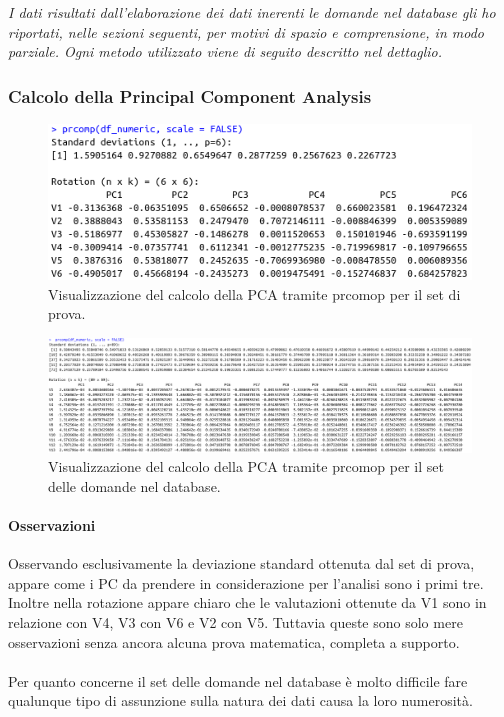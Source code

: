 \textit{I dati risultati dall'elaborazione dei dati inerenti le domande nel database gli ho riportati, nelle sezioni seguenti, per motivi di spazio e comprensione, in modo parziale. Ogni metodo utilizzato viene di seguito descritto nel dettaglio.}

\subsubsection{Calcolo della Principal Component Analysis}
\label{Calcolo della Principal Component Analysis}
\begin{figure}[H]
\centering
	\includegraphics[width=0.80\linewidth]{../../PCA/plot/prcomp_rete-prova.png}
	\caption{Visualizzazione del calcolo della PCA tramite prcomop per il set di prova.}
	\label{Visualizzazione del calcolo della PCA tramite prcomop per il set di prova.}
\end{figure}

\begin{figure}[H]
\centering
	\includegraphics[width=1\linewidth]{../../PCA/plot/prcomp_rete-db.png}
	\caption{Visualizzazione del calcolo della PCA tramite prcomop per il set delle domande nel database.}
	\label{Visualizzazione del calcolo della PCA tramite prcomop per il set delle domande nel database.}
\end{figure}
\noindent

\paragraph{Osservazioni}
Osservando  esclusivamente la deviazione standard ottenuta dal set di prova, appare come i PC da prendere in considerazione per l'analisi sono i primi tre. Inoltre  nella rotazione appare chiaro che le valutazioni ottenute da V1 sono in relazione con V4, V3 con V6 e V2 con V5. Tuttavia queste sono solo mere osservazioni senza ancora alcuna prova matematica,  completa a supporto. \\\\ Per quanto concerne il set delle domande nel database \`e molto difficile fare qualunque tipo di assunzione sulla natura dei dati causa la loro numerosit\`a.

